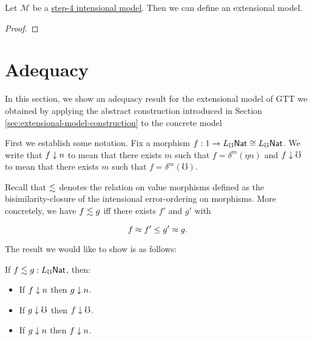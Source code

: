 



\begin{lemma}\label{lem:step-4-model-to-extensional-model}
  Let $\mathcal M$ be a \hyperref[def:step-4-model]{step-4 intensional model}.
  Then we can define an extensional model.
\end{lemma}
\begin{proof}
  
  
\end{proof}



\section{Adequacy}\label{sec:appendix-adequacy}

In this section, we show an adequacy result for the extensional model of GTT we obtained by
applying the abstract construction introduced in Section
\ref{sec:extensional-model-construction} to the concrete model

First we establish some notation. Fix a morphism $f : 1 \to L_\mho \mathsf{Nat} \cong L_\mho \mathsf{Nat}$.
We write that $f \downarrow n$ to mean that there exists $m$ such that $f = \delta^m(\eta n)$
and $f \downarrow \mho$ to mean that there exists $m$ such that $f = \delta^m(\mho)$.

Recall that $\lesssim$ denotes the relation on value morphisms defined as the bisimilarity-closure
of the intensional error-ordering on morphisms.
More concretely, we have $f \lesssim g$ iff there exists $f'$ and $g'$ with

\[ f \approx f' \le g' \approx g. \]

The result we would like to show is as follows:
\begin{lemma}
If $f \lesssim g : L_\mho \mathsf{Nat}$, then:
\begin{itemize}
  \item If $f \downarrow n$ then $g \downarrow n$.
  \item If $g \downarrow \mho$ then $f \downarrow \mho$.
  \item If $g \downarrow n$ then $f \downarrow n$.
\end{itemize}
\end{lemma}

